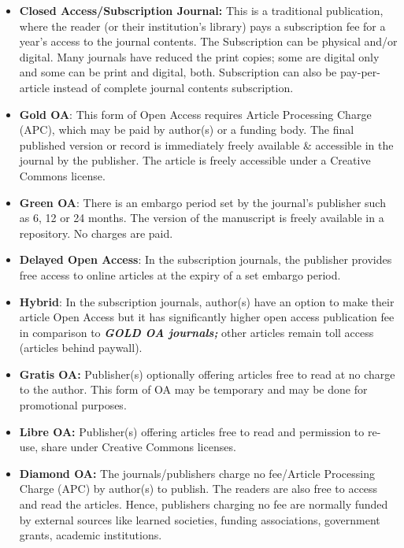 \documentclass[
  letterpaper,
  DIV=11,
  numbers=noendperiod]{scrreport}
\providecommand{\tightlist}{%
  \setlength{\itemsep}{0pt}\setlength{\parskip}{0pt}}\usepackage{longtable,booktabs,array}
\begin{document}
\begin{itemize}
\tightlist
\item
  \textbf{Closed Access/Subscription Journal:} This is a traditional
  publication, where the reader (or their institution's library) pays a
  subscription fee for a year's access to the journal contents. The
  Subscription can be physical and/or digital. Many journals have
  reduced the print copies; some are digital only and some can be print
  and digital, both. Subscription can also be pay-per-article instead of
  complete journal contents subscription.
\item
  \textbf{Gold OA}: This form of Open Access requires Article Processing
  Charge (APC), which may be paid by author(s) or a funding body. The
  final published version or record is immediately freely available \&
  accessible in the journal by the publisher. The article is freely
  accessible under a Creative Commons license.
\item
  \textbf{Green OA}: There is an embargo period set by the journal's
  publisher such as 6, 12 or 24 months. The version of the manuscript is
  freely available in a repository. No charges are paid.
\item
  \textbf{Delayed Open Access}: In the subscription journals, the
  publisher provides free access to online articles at the expiry of a
  set embargo period.
\item
  \textbf{Hybrid}: In the subscription journals, author(s) have an
  option to make their article Open Access but it has significantly
  higher open access publication fee in comparison to \textbf{\emph{GOLD
  OA journals; }}other articles remain toll access (articles behind
  paywall).
\item
  \textbf{Gratis OA: }Publisher(s) optionally offering articles free to
  read at no charge to the author. This form of OA may be temporary and
  may be done for promotional purposes.
\item
  \textbf{Libre OA: }Publisher(s) offering articles free to read and
  permission to re-use, share under Creative Commons licenses.
\item
  \textbf{Diamond OA: }The journals/publishers charge no fee/Article
  Processing Charge (APC) by author(s) to publish. The readers are also
  free to access and read the articles. Hence, publishers charging no
  fee are normally funded by external sources like learned societies,
  funding associations, government grants, academic institutions.
\end{itemize}
\end{document}
